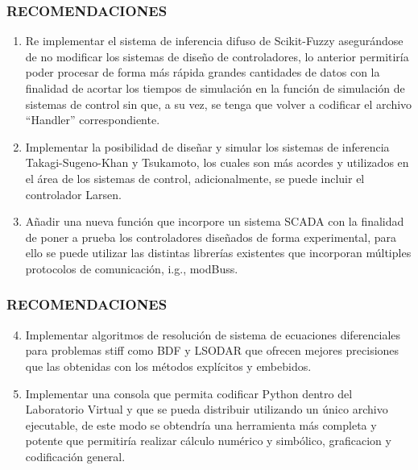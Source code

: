 \documentclass[usenames,xcolor={dvipsnames, table}]{beamer}
\begin{document}
\begin{frame}
	\frametitle{RECOMENDACIONES}
	\small
	\vspace{20pt}
	\begin{enumerate}
		\justifying   
		\item Re implementar el sistema de inferencia difuso de Scikit-Fuzzy asegurándose de no modificar los sistemas de diseño de controladores, lo anterior permitiría poder procesar de forma más rápida grandes cantidades de datos con la finalidad de acortar los tiempos de simulación en la función de simulación de sistemas de control sin que, a su vez, se tenga que volver a codificar el archivo ``Handler'' correspondiente.
		
		\item Implementar la posibilidad de diseñar y simular los sistemas de inferencia Takagi-Sugeno-Khan y Tsukamoto, los cuales son más acordes y utilizados en el área de los sistemas de control, adicionalmente, se puede incluir el controlador Larsen.
		
		\item Añadir una nueva función que incorpore un sistema SCADA con la finalidad de poner a prueba los controladores diseñados de forma experimental, para ello se puede utilizar las distintas librerías existentes que incorporan múltiples protocolos de comunicación, i.g., modBuss.
		
	\end{enumerate}

\end{frame}

\begin{frame}
	\frametitle{RECOMENDACIONES}
	\vspace{15pt}
	\small
	\begin{enumerate}
		\setcounter{enumi}{3}
		\setlength\itemsep{1em}
		\justifying 
		\item Implementar algoritmos de resolución de sistema de ecuaciones diferenciales para problemas stiff como BDF y LSODAR que ofrecen mejores precisiones que las obtenidas con los métodos explícitos y embebidos.
		
		\item Implementar una consola que permita codificar Python dentro del Laboratorio Virtual y que se pueda distribuir utilizando un único archivo ejecutable, de este modo se obtendría una herramienta más completa y potente que permitiría realizar cálculo numérico y simbólico, graficacion y codificación general.
	\end{enumerate}
	

\end{frame}
\end{document}
